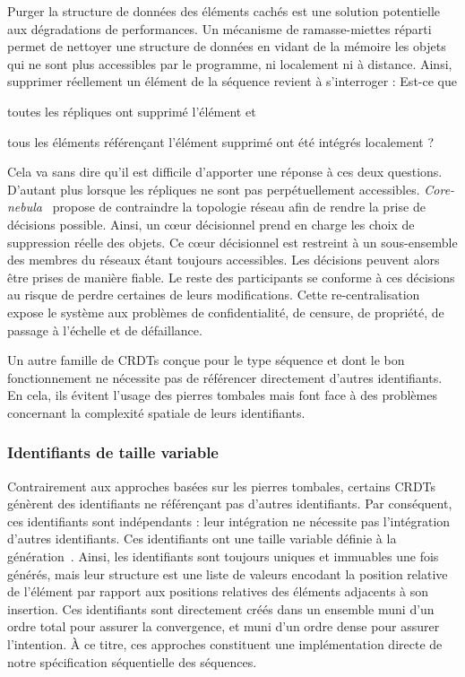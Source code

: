 Purger la structure de données des éléments cachés est une solution potentielle
aux dégradations de performances. Un mécanisme de ramasse-miettes
réparti~\cite{abdullahi1998garbage} permet de nettoyer une structure de données
en vidant de la mémoire les objets qui ne sont plus accessibles par le
programme, ni localement ni à distance. Ainsi, supprimer réellement un élément
de la séquence revient à s'interroger : \og Est-ce que
\begin{inparaenum}[(i)]
\item toutes les répliques ont supprimé l'élément et
\item tous les éléments référençant l'élément supprimé ont été intégrés
  localement ?
\end{inparaenum}\fg Cela va sans dire qu'il est difficile d'apporter une réponse
à ces deux questions. D'autant plus lorsque les répliques ne sont pas
perpétuellement accessibles. \emph{Core-nebula}~\cite{letia2009crdts} propose de
contraindre la topologie réseau afin de rendre la prise de décisions
possible. Ainsi, un cœur décisionnel prend en charge les choix de suppression
réelle des objets.  Ce cœur décisionnel est restreint à un sous-ensemble des
membres du réseaux étant toujours accessibles. Les décisions peuvent alors être
prises de manière fiable. Le reste des participants se conforme à ces décisions
au risque de perdre certaines de leurs modifications. Cette re-centralisation
expose le système aux problèmes de confidentialité, de censure, de propriété, de
passage à l'échelle et de défaillance.
 
Un autre famille de CRDTs conçue pour le type séquence et dont le bon
fonctionnement ne nécessite pas de référencer directement d'autres
identifiants. En cela, ils évitent l'usage des pierres tombales mais font face à
des problèmes concernant la complexité spatiale de leurs identifiants.

\subsubsection{Identifiants de taille variable}
\label{repl:subsubsec:variable}

Contrairement aux approches basées sur les pierres tombales, certains CRDTs
génèrent des identifiants ne référençant pas d'autres identifiants. Par
conséquent, ces identifiants sont indépendants : leur intégration ne nécessite
pas l'intégration d'autres identifiants. Ces identifiants ont une taille
variable définie à la génération~\cite{andre2013supporting,
  preguica2009commutative, weiss2009logoot}.  Ainsi, les identifiants sont
toujours uniques et immuables une fois générés, mais leur structure est une
liste de valeurs encodant la position relative de l'élément par rapport aux
positions relatives des éléments adjacents à son insertion. Ces identifiants
sont directement créés dans un ensemble muni d'un ordre total pour assurer la
convergence, et muni d'un ordre dense pour assurer l'intention. À ce titre, ces
approches constituent une implémentation directe de notre spécification
séquentielle des séquences.


